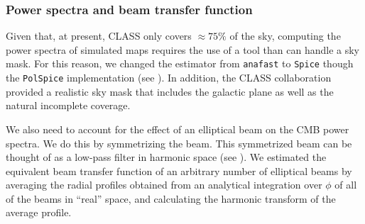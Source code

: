 \documentclass[a4paper,11pt]{article}
\begin{document}

\subsubsection{Power spectra and beam transfer function}


Given that, at present, CLASS only covers $\approx 75\%$ of the sky, computing the power spectra of simulated maps requires the use of a tool than can handle a sky mask. For this reason, we changed the estimator from \texttt{anafast} to \texttt{Spice} though the \texttt{PolSpice} implementation (see \cite{2004MNRAS.350..914C}). In addition, the CLASS collaboration provided a realistic sky mask that includes the galactic plane as well as the natural incomplete coverage. 

We also need to account for the effect of an elliptical beam on the CMB power spectra. We do this by symmetrizing the beam. This symmetrized beam can be thought of as a low-pass filter in harmonic space (see \cite{2003ApJS..148...39P}). We estimated the equivalent beam transfer function of an arbitrary number of elliptical beams by averaging the radial profiles obtained from an analytical integration over $\phi$ of all of the beams in ``real'' space,  and calculating the harmonic transform of the average profile.

\end{document}
